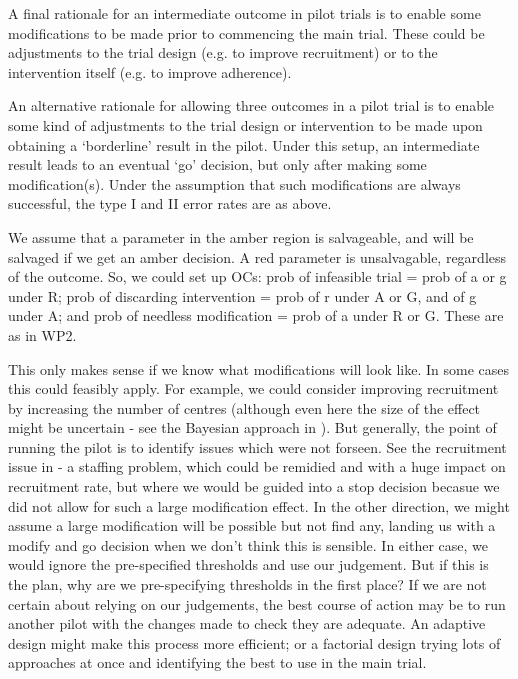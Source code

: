 \documentclass[sagev]{sagej} %
\begin{document}
A final rationale for an intermediate outcome in pilot trials is to enable some modifications to be made prior to commencing the main trial. These could be adjustments to the trial design (e.g. to improve recruitment) or to the intervention itself (e.g. to improve adherence).

An alternative rationale for allowing three outcomes in a pilot trial is to enable some kind of adjustments to the trial design or intervention to be made upon obtaining a `borderline' result in the pilot. Under this setup, an intermediate result leads to an eventual `go' decision, but only after making some modification(s). Under the assumption that such modifications are always successful, the type I and II error rates are as above. 

We assume that a parameter in the amber region is salvageable, and will be salvaged if we get an amber decision. A red parameter is unsalvagable, regardless of the outcome. So, we could set up OCs: prob of infeasible trial = prob of a or g under R; prob of discarding intervention = prob of r under A or G, and of g under A; and prob of needless modification = prob of a under R or G. These are as in WP2. 

This only makes sense if we know what modifications will look like. In some cases this could feasibly apply. For example, we could consider improving recruitment by increasing the number of centres (although even here the size of the effect might be uncertain - see the Bayesian approach in \cite{Hampson2017}). But generally, the point of running the pilot is to identify issues which were not forseen. See the recruitment issue in \cite{Avery2017} - a staffing problem, which could be remidied and with a huge impact on recruitment rate, but where we would be guided into a stop decision becasue we did not allow for such a large modification effect. In the other direction, we might assume a large modification will be possible but not find any, landing us with a modify and go decision when we don't think this is sensible. In either case, we would ignore the pre-specified thresholds and use our judgement. But if this is the plan, why are we pre-specifying thresholds in the first place? If we are not certain about relying on our judgements, the best course of action may be to run another pilot with the changes made to check they are adequate. An adaptive design might make this process more efficient; or a factorial design trying lots of approaches at once and identifying the best to use in the main trial.
\end{document}
